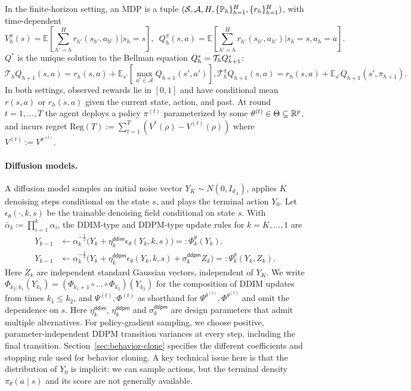In the finite-horizon setting, an MDP is a tuple $(\mathcal{S},\mathcal{A}, H,\{{\mathbb{P}}_h\}_{h=1}^{H} ,\{r_h\}_{h=1}^{H})$, with time-dependent
$$\textstyle{V_h^{\pi}(s) = \mathbb{E}\left[\sum_{h'=h}^{H}r_{h'}(s_{h'},a_{h'})|s_h = s\right], \enspace Q_h^{\pi}(s,a) = \mathbb{E}\left[\sum_{h'=h}^{H}r_{h'}(s_{h'},a_{h'})|s_h = s,a_h=a\right]}.$$
$Q^*$ is the unique solution to the Bellman equation $Q_h^* = {\mathcal{T}}_h Q_{h+1}^*$:
$$
    \mathcal{T}_{h}Q_{h+1}(s,a) = r_h(s,a) + \mathbb{E}_{s'}[\max_{a'\in\mathcal{A}}Q_{h+1}(s',a')],
    \mathcal{T}^\pi_{h}Q_{h+1}(s,a) = r_h(s,a) + \mathbb{E}_{s'}Q_{h+1}(s',\pi_{h+1}).
$$
In both settings, observed rewards lie in $[0,1]$ and have conditional mean $r(s,a)$ or $r_h(s,a)$ given the current state, action, and past. At round $t=1,...,T$ the agent deploys a policy $\pi^{(t)}$ parameterized by some $\theta^{(t)} \in \Theta \subseteq {\mathbb{R}}^p$, and incurs regret 
$\textstyle{\text{Reg}(T) := \sum_{t=1}^T \left(V^*(\rho) - V^{(t)}(\rho)\right)}$ where $V^{(t)} := V^{\pi^{(t)}}$.


\paragraph{Diffusion models.}
A diffusion model samples an initial noise vector $Y_K\sim N(0,I_{d_A})$, applies $K$ denoising
steps conditional on the state $s$, and plays the terminal action $Y_0$.
Let $\epsilon_\theta(\cdot,k,s)$ be the trainable denoising field conditional on state $s$.
With $\bar{\alpha}_k \coloneqq \prod_{i=1}^k \alpha_i$, the DDIM-type \citep{song2022denoisingdiffusionimplicitmodels} and DDPM-type \citep{ho2020denoising} update rules for $k=K,...,1$ are 
\begin{align}
    Y_{k-1} &\gets \alpha_k^{-\frac{1}{2}}\big(Y_k + \eta_k^{\mathsf{ddim}} \epsilon_{\theta}(Y_k, k, s)\big) =: \Phi_k^\theta(Y_k). \label{eq:DDIM}\\
    Y_{k-1} &\gets \alpha_k^{-\frac{1}{2}}\big(Y_k + \eta_k^{\mathsf{ddpm}} \epsilon_{\theta}(Y_k, k, s) + \sigma_k^{\mathsf{ddpm}} Z_k\big)
    =: \Psi_k^\theta(Y_k, Z_k). \label{eq:DDPM}
\end{align}
Here $Z_k$ are independent standard Gaussian vectors, independent of $Y_K$. We write $\Phi_{k_2:k_1}(Y_{k_2}) = (\Phi_{k_1+1} \circ ... \circ \Phi_{k_2})(Y_{k_2})$ for the composition of DDIM updates from times $k_1 \leq k_2$, and $\Psi^{(t)}, \Phi^{(t)}$ as shorthand for $\Psi^{\theta^{(t)}}, \Phi^{\theta^{(t)}}$ and omit the dependence on $s$. Here $\eta_k^{\mathsf{ddim}}$, $\eta_k^{\mathsf{ddpm}}$ and $\sigma_k^{\mathsf{ddpm}}$ are design parameters that admit multiple alternatives. For policy-gradient sampling, we choose positive, parameter-independent DDPM transition variances at every step, including the final transition. Section~\ref{sec:behavior-clone} specifies the different coefficients and stopping rule used for behavior cloning. A key technical issue here is that the distribution of $Y_0$ is implicit: we can sample actions, but the terminal density
$\pi_\theta(a\mid s)$ and its score are not generally available.


